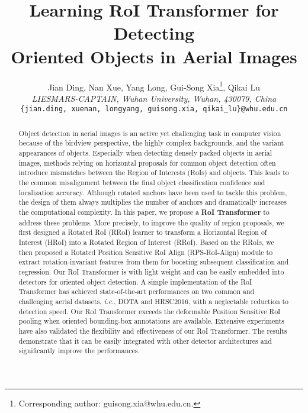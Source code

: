 \documentclass[11pt,onecolumn]{article}         \usepackage[top=3.6cm, bottom=3.2cm, left=2.3cm, right=2.3cm]{geometry}
\newcommand{\ie}{\emph{i.e.}}
\begin{document}
\title{Learning RoI Transformer for Detecting \\ Oriented Objects in Aerial Images}


{
\author{Jian Ding, Nan Xue, Yang Long, Gui-Song Xia\thanks{Corresponding author: guisong.xia@whu.edu.cn.}, Qikai Lu\\
{\em LIESMARS-CAPTAIN, Wuhan University, Wuhan, 430079, China}\\
{\tt\small \{jian.ding, xuenan, longyang, guisong.xia, qikai\_lu\}@whu.edu.cn}
}
}

\maketitle


\begin{abstract}
Object detection in aerial images is an active yet challenging task in computer vision because of the birdview perspective, the highly complex backgrounds, and the variant appearances of objects. Especially when detecting densely packed objects in aerial images, methods relying on horizontal proposals for common object detection often introduce mismatches between the Region of Interests (RoIs) and objects. 
This leads to the common misalignment between the final object classification confidence and localization accuracy. 
Although rotated anchors have been used to tackle this problem, the design of them always multiplies the number of anchors and dramatically increases the computational complexity.  
In this paper, we propose a {\bf RoI Transformer} to address these problems. More precisely, to improve the quality of region proposals, we first designed a Rotated RoI (RRoI) learner to transform a Horizontal Region of Interest (HRoI) into a Rotated Region of Interest (RRoI). Based on the RRoIs, we then proposed a Rotated Position Sensitive RoI Align (RPS-RoI-Align) module to extract rotation-invariant features from them for boosting subsequent classification and regression. 
Our RoI Transformer is with light weight and can be easily embedded into detectors for oriented object detection. A simple implementation of the RoI Transformer has achieved state-of-the-art performances on two common and challenging aerial datasets, \ie, DOTA and HRSC2016, with a neglectable reduction to detection speed. Our RoI Transformer exceeds the deformable Position Sensitive RoI pooling when oriented bounding-box annotations are available.
Extensive experiments have also validated the flexibility and effectiveness of our RoI Transformer. The results demonstrate that it can be easily integrated with other detector architectures and significantly improve the performances. 
\end{abstract}
\end{document}
